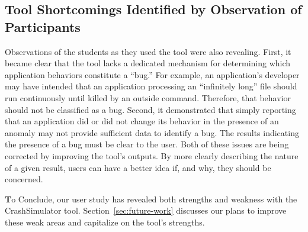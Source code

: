\subsection{Tool Shortcomings Identified by Observation of Participants}
\label{subsec:tool-shortcomings}
Observations of the students as they used the tool were also revealing.
First,
it became clear that the tool
lacks a dedicated mechanism
for determining
which application behaviors constitute a ``bug.''
For example, an application's developer
may have intended that an application processing an ``infinitely long'' file should run continuously
until killed by an outside command.
Therefore, that behavior should not be classified as a bug.
Second,
it demonstrated that
simply reporting that an application did or did not change its behavior
in the presence of an anomaly may not provide sufficient data to identify a bug. The results indicating the presence of a bug must be clear to the user.
Both of these issues are being corrected
by improving the tool's outputs.
By more clearly describing
the nature of a given result,
users can have a better idea
if,
and why,
they should be concerned.

{\textbf To Conclude}, our user study has revealed both strengths and weakness
with the CrashSimulator tool.  Section~\ref{sec:future-work}
discusses our plans to improve
these weak areas and capitalize on the tool's strengths.
